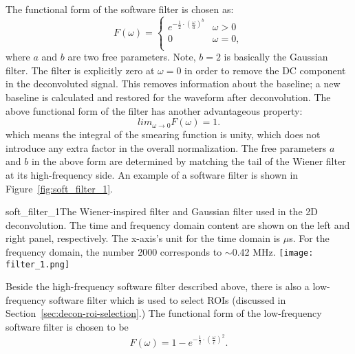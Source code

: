 The functional form of the software filter is chosen as:
\begin{equation}
F(\omega) = 
\begin{cases}
e^{- \frac{1}{2} \cdot \left( \frac{\omega}{a} \right)^b} &  \omega >0 \\
0 &  \omega = 0, \\
\end{cases}
\end{equation}
where $a$ and $b$ are two free parameters.  Note, $b=2$ is basically the Gaussian filter. 
The filter is explicitly zero at $\omega = 0$ in order to remove the DC component in the 
deconvoluted signal. This removes information about the baseline;  a new baseline is 
calculated and restored for the waveform after deconvolution. The above functional form 
of the filter has another advantageous property:
\begin{equation}
lim_{\omega \rightarrow 0} F(\omega) = 1.
\end{equation}
which means the integral of the smearing function is unity, which does not introduce any
extra factor in the overall normalization. The free parameters $a$ and $b$ in the above 
form are determined by matching the tail of the Wiener filter at its high-frequency side. 
An example of a software filter is shown in Figure~\ref{fig:soft_filter_1}. 

\begin{cdrfigure}{soft_filter_1}{The Wiener-inspired filter and Gaussian filter used in the 2D deconvolution. 
The time and frequency domain content are shown on the left and right panel, respectively.
The x-axis's unit for the time domain is $\mu$s. For the frequency domain, the number 2000
corresponds to $\sim$0.42 MHz.}
\texttt{[image: filter\_1.png]}
\end{cdrfigure}

Beside the high-frequency software filter described above, there is also a low-frequency 
software filter which is used to select ROIs (discussed in Section~\ref{sec:decon-roi-selection}.) %
The functional form of the low-frequency software filter is chosen to be 
\begin{equation}
F(\omega) = 1- e^{-\frac{1}{2}\cdot \left( \frac{\omega}{c} \right)^2}.
\end{equation}

